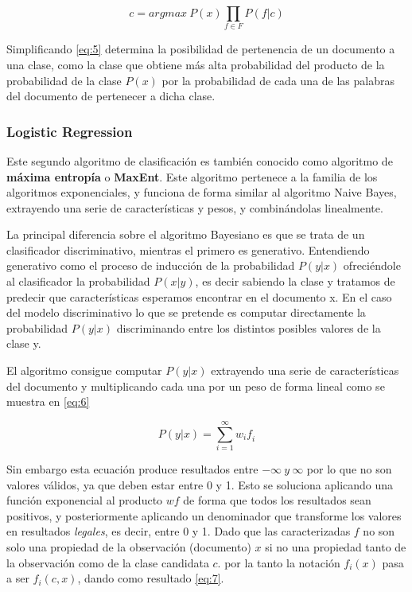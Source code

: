 \begin{equation} \label{eq:5}
\mathit{c = argmax\ P(x)\prod_{f \in F} P(f|c)}
\end{equation} 

Simplificando \ref{eq:5} determina la posibilidad de pertenencia de un documento a una clase, como la clase que obtiene más alta probabilidad del producto de la probabilidad de la clase \(P(x)\) por la probabilidad de cada una de las palabras del documento de pertenecer a dicha clase.


\subsubsection{Logistic Regression}\label{lr}

Este segundo algoritmo de clasificación es también conocido como algoritmo de \textbf{máxima entropía} o \textbf{MaxEnt}. Este algoritmo pertenece a la familia de los algoritmos exponenciales, y funciona de forma similar al algoritmo Naive Bayes, extrayendo una serie de características y pesos, y combinándolas linealmente.

La principal diferencia sobre el algoritmo Bayesiano es que se trata de un clasificador discriminativo, mientras el primero es generativo. Entendiendo generativo como el proceso de inducción de la probabilidad \(P(y|x)\) ofreciéndole al clasificador la probabilidad \(P(x|y)\), es decir sabiendo la clase y tratamos de predecir que características esperamos encontrar en el documento x. En el caso del modelo discriminativo lo que se pretende es computar directamente la probabilidad \(P(y|x)\) discriminando entre los distintos posibles valores de la clase y.

El algoritmo consigue computar \(P(y|x)\) extrayendo una serie de características del documento y multiplicando cada una por un peso de forma lineal como se muestra en \ref{eq:6}

\begin{equation}\label{eq:6}
\mathit{P(y|x) = \sum_{i=1}^{\infty} w_if_i}
\end{equation}

Sin embargo esta ecuación produce resultados entre \(-\infty\ y\ \infty\) por lo que no son valores válidos, ya que deben estar entre 0 y 1. Esto se soluciona aplicando una función exponencial al producto \(wf\) de forma que todos los resultados sean positivos, y posteriormente aplicando un denominador que transforme los valores en resultados \emph{legales}, es decir, entre 0 y 1.
Dado que las caracterizadas \(f\) no son solo una propiedad de la observación (documento) \(x\) si no una propiedad tanto de la observación como de la clase candidata \(c\). por la tanto la notación \(f_i(x)\) pasa a ser \(f_i(c,x)\), dando como resultado \ref{eq:7}.

